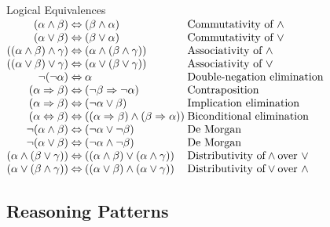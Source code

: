 \documentclass[14pt]{beamer}
\begin{document}
\begin{frame}{Logical Equivalences}
	\small
	$
	\begin{array}{@{}r@{\hspace{.25em}}c@{\hspace{.25em}}l@{\hspace{.25em}}l}
	(\alpha \land \beta)                &\liff& (\beta \land \alpha)                             & \mbox{Commutativity of } \land\\
	(\alpha \lor \beta)                 &\liff& (\beta\lor \alpha)                               & \mbox{Commutativity of } \lor\\
	((\alpha \land \beta)\land \gamma)  &\liff& (\alpha\land (\beta\land \gamma))                & \mbox{Associativity of } \land\\
	((\alpha \lor \beta)\lor \gamma)    &\liff& (\alpha\lor (\beta\lor \gamma))                  & \mbox{Associativity of } \lor\\
	\lnot(\lnot \alpha)                 &\liff& \alpha                                           & \mbox{Double-negation elimination}\\
	(\alpha \limpl \beta)               &\liff& (\lnot \beta \limpl \lnot \alpha)                & \mbox{Contraposition}\\
	(\alpha \limpl \beta)               &\liff& (\lnot \alpha \lor \beta)                        & \mbox{Implication elimination}\\
	(\alpha \liff \beta)                &\liff& ((\alpha\limpl \beta)\land (\beta\limpl \alpha)) & \mbox{Biconditional elimination}\\
	\lnot(\alpha \land \beta)           &\liff& (\lnot \alpha \lor \lnot \beta)                  & \mbox{De Morgan}\\
	\lnot(\alpha \lor \beta)            &\liff& (\lnot \alpha \land \lnot \beta)                 & \mbox{De Morgan}\\
	(\alpha \land (\beta \lor \gamma))  &\liff& ((\alpha\land \beta)\lor (\alpha\land \gamma))   & \mbox{Distributivity of} \land \mbox{over } \lor\\
	(\alpha \lor (\beta \land \gamma))  &\liff& ((\alpha\lor \beta)\land (\alpha\lor \gamma))    & \mbox{Distributivity of} \lor \mbox{over } \land
	\end{array}
	$
\end{frame}


\subsection{Reasoning Patterns}
\end{document}
